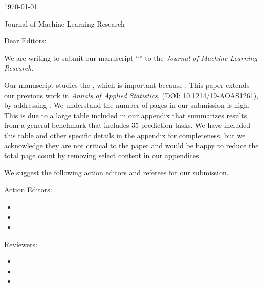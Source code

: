 


\hfill{\today}

Journal of Machine Learning Research

\bigskip

Dear Editors:

We are writing to submit our manuscript ``'' to the \emph{Journal of Machine Learning Research}.

Our manuscript studies the , which is important because . This paper extends our previous work in \emph{Annals of Applied Statistics},  (DOI: 10.1214/19-AOAS1261), by addressing . We understand the number of pages in our submission is high. This is due to a large table included in our appendix that summarizes results from a general benchmark that includes 35 prediction tasks. We have included this table and other specific details in the appendix for completeness, but we acknowledge they are not critical to the paper and would be happy to reduce the total page count by removing select content in our appendices.

We suggest the following action editors and referees for our submission.


Action Editors:
\begin{itemize}
    \item {}
    \item {}
    \item {}
\end{itemize}

Reviewers:
\begin{itemize}
    \item {}
    \item {}
    \item {}
\end{itemize}


